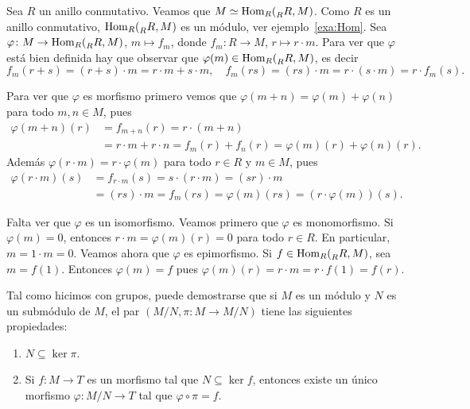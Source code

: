 \begin{example}
Sea $R$ un anillo conmutativo. Veamos que $M\simeq\operatorname{Hom}_R(\prescript{}{R}R,M)$. 
Como $R$ es un anillo conmutativo, $\operatorname{Hom}_R(\prescript{}{R}R,M)$ es un módulo, ver ejemplo~\ref{exa:Hom}.
Sea $\varphi\colon M\to\operatorname{Hom}_R(\prescript{}{R}R,M)$, $m\mapsto f_m$, donde $f_m\colon R\to M$, $r\mapsto r\cdot m$. Para ver que $\varphi$ está bien definida
hay que observar que $\varphi(m)\in\operatorname{Hom}_R(\prescript{}{R}R,M)$, es decir 
\[
f_m(r+s)=(r+s)\cdot m=r\cdot m+s\cdot m,\quad
f_m(rs)=(rs)\cdot m=r\cdot (s\cdot m)=r\cdot f_m(s).
\]

Para ver que $\varphi$ es morfismo primero vemos que $\varphi(m+n)=\varphi(m)+\varphi(n)$ para todo $m,n\in M$, pues 
\begin{align*}
\varphi(m+n)(r)&=f_{m+n}(r)=r\cdot (m+n)\\
&=r\cdot m+r\cdot n=f_m(r)+f_n(r)=\varphi(m)(r)+\varphi(n)(r).
\end{align*}
Además $\varphi(r\cdot m)=r\cdot\varphi(m)$ para 
todo $r\in R$ y $m\in M$, pues 
\begin{align*}
%
\varphi(r\cdot m)(s)&=f_{r\cdot m}(s)
=s\cdot (r\cdot m)
=(sr)\cdot m\\
&=(rs)\cdot m=f_m(rs)=\varphi(m)(rs)=(r\cdot\varphi(m))(s).
\end{align*}

Falta ver que $\varphi$ es un isomorfismo. 
Veamos primero que $\varphi$ es monomorfismo. Si $\varphi(m)=0$, entonces $r\cdot m=\varphi(m)(r)=0$ para todo $r\in R$. En particular, 
$m=1\cdot m=0$. 	Veamos ahora que $\varphi$ es epimorfismo. Si $f\in\operatorname{Hom}_R(\prescript{}{R}R,M)$, sea $m=f(1)$. Entonces $\varphi(m)=f$ pues
$\varphi(m)(r)=r\cdot m=r\cdot f(1)=f(r)$.
\end{example}

Tal como hicimos con grupos, puede demostrarse que si $M$ es un módulo y $N$ es un submódulo de $M$, el par
$(M/N,\pi\colon M\to M/N)$ tiene las siguientes propiedades:
\begin{enumerate}
\item $N\subseteq \ker \pi$.
\item Si $f\colon M\to T$ es un morfismo tal que $N\subseteq \ker f$, entonces existe un único morfismo $\varphi\colon M/N\to T$ tal que $\varphi\circ\pi =f$.  
\end{enumerate}

